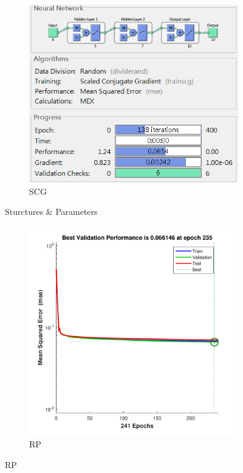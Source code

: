 \documentclass[12pt,a4paper]{article}
\begin{document}
\begin{CJK}{UTF8}{bsmi}
\begin{enumerate}
\begin{enumerate}
\begin{figure}[H]
\begin{subfigure}{.5\textwidth}
	 		\end{subfigure}%
	 		\begin{subfigure}{.5\textwidth}
	 			\centering
	 			\includegraphics[width=0.92\linewidth]{SCG4}
	 			\caption{SCG}
	 			
	 		\end{subfigure}
	 		\caption{Sturctures \& Parameters}
	 		
	 	\end{figure}
	 	
	 	
	 	\begin{figure}[H]
	 		\centering
	 		\begin{subfigure}{.5\textwidth}
	 			\centering
	 			\includegraphics[width=1\linewidth]{yeast_rp_per}
	 			\caption{RP}
	 			

\end{subfigure}
\end{figure}
\end{enumerate}
\end{enumerate}
\end{CJK}
\end{document}
